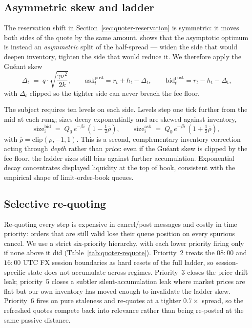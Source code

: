 \subsection{Asymmetric skew and ladder}
\label{sec:quoter-ladder}

The reservation shift in Section~\ref{sec:quoter-reservation} is
symmetric: it moves both sides of the quote by the same amount.
\citet{gueant2017optimal} shows that the asymptotic optimum is
instead an \emph{asymmetric} split of the half-spread --- widen the
side that would deepen inventory, tighten the side that would reduce
it. We therefore apply the Guéant skew
\[
  \Delta_t \;=\; q \cdot \sqrt{\frac{\gamma\sigma^2}{2k}},
  \qquad
  \mathrm{ask}^{\mathrm{post}}_t = r_t + h_t - \Delta_t,
  \qquad
  \mathrm{bid}^{\mathrm{post}}_t = r_t - h_t - \Delta_t,
\]
with $\Delta_t$ clipped so the tighter side can never breach the
fee floor.

The subject requires ten levels on each side. Levels step one tick
further from the mid at each rung; sizes decay exponentially and
are skewed against inventory,
\[
  \mathrm{size}^{\mathrm{bid}}_i \;=\; Q_0\,e^{-\beta i}\,(1 - \tfrac{1}{2}\overline{\rho}),
  \qquad
  \mathrm{size}^{\mathrm{ask}}_i \;=\; Q_0\,e^{-\beta i}\,(1 + \tfrac{1}{2}\overline{\rho}),
\]
with $\overline{\rho} = \mathrm{clip}(\rho,-1,1)$. This is a second,
complementary inventory correction acting through \emph{depth}
rather than \emph{price}: even if the Guéant skew is clipped by
the fee floor, the ladder sizes still bias against further
accumulation. Exponential decay concentrates displayed liquidity at
the top of book, consistent with the empirical shape of
limit-order-book queues.

\subsection{Selective re-quoting}
\label{sec:quoter-requote}

Re-quoting every step is expensive in cancel/post messages and
costly in time priority: orders that are still valid lose their
queue position on every spurious cancel. We use a strict
six-priority hierarchy, with each lower priority firing only if
none above it did (Table~\ref{tab:quoter-requote}). Priority~2
treats the $08{:}00$ and $16{:}00$ UTC FX session boundaries as
hard resets of the full ladder, so session-specific state does not
accumulate across regimes. Priority~3 closes the price-drift leak;
priority~5 closes a subtler silent-accumulation leak where market
prices are flat but our own inventory has moved enough to
invalidate the ladder skew. Priority~6 fires on pure staleness and
re-quotes at a tighter $0.7\times$ spread, so the refreshed quotes
compete back into relevance rather than being re-posted at the
same passive distance.

